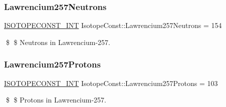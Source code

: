 \subsubsection{\texorpdfstring{Lawrencium257\+Neutrons}{Lawrencium257Neutrons}}
{\footnotesize\ttfamily \mbox{\hyperlink{group___isotope_const-_macros_ga5f18360b3e99483a35c32d789e62621c}{I\+S\+O\+T\+O\+P\+E\+C\+O\+N\+S\+T\+\_\+\+I\+NT}} Isotope\+Const\+::\+Lawrencium257\+Neutrons = 154}

\$ \$ Neutrons in Lawrencium-\/257. \mbox{\label{group___isotope_const-_lawrencium-_lr257_ga7483bad407444319d881f6dd7d733628}} 
\subsubsection{\texorpdfstring{Lawrencium257\+Protons}{Lawrencium257Protons}}
{\footnotesize\ttfamily \mbox{\hyperlink{group___isotope_const-_macros_ga5f18360b3e99483a35c32d789e62621c}{I\+S\+O\+T\+O\+P\+E\+C\+O\+N\+S\+T\+\_\+\+I\+NT}} Isotope\+Const\+::\+Lawrencium257\+Protons = 103}

\$ \$ Protons in Lawrencium-\/257. 